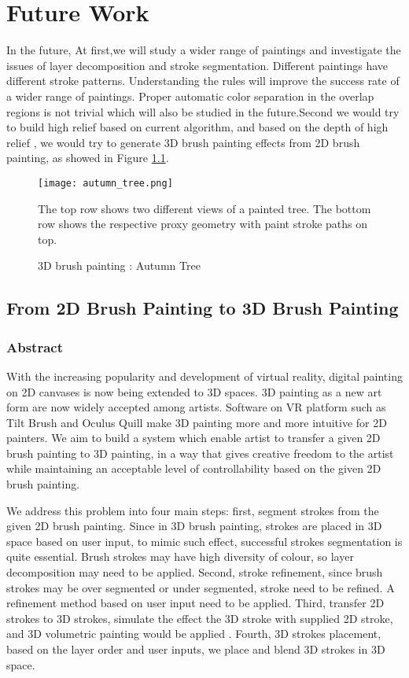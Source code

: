 \chapter{Future Work}
In the future, At first,we will study a wider range of paintings and investigate the issues of layer decomposition and stroke segmentation. Different paintings have different stroke patterns. Understanding the rules will improve the success rate of a wider range of paintings. Proper automatic color separation in the overlap regions is not trivial which will also be studied in the future.Second we would try to build high relief based on current algorithm, and based on the depth of high relief , we would try to generate 3D brush painting effects from 2D brush painting, as showed in Figure \ref{Autumn Tree}.
\begin{figure}[H]
	\centering
	\texttt{[image: autumn\_tree.png]}
	\caption{3D brush painting : Autumn Tree}
	\label{Autumn Tree}
	\medskip
	The top row shows two different views of a painted tree. The bottom row shows the respective proxy geometry with paint stroke paths on top.
\end{figure}
\section{From 2D Brush Painting to 3D Brush Painting}
\subsection{Abstract} 
With the increasing popularity and development of virtual reality, digital painting on 2D canvases is now being extended to 3D spaces. 3D painting as a new art form are now widely accepted among artists. Software on VR platform such as Tilt Brush and Oculus Quill make 3D painting more and more intuitive for 2D painters.   
We aim to build a system which enable artist to transfer a given 2D brush painting to 3D painting, in a way that gives creative freedom to the artist while maintaining an acceptable level of controllability based on the given 2D brush painting. 

We address this problem into four main steps: 
first, segment strokes from the given 2D brush painting. Since in 3D brush painting, strokes are placed in 3D space based on user input, to mimic such effect, successful strokes segmentation is quite essential. Brush strokes may have high diversity of colour, so layer decomposition may need to be applied. 
Second, stroke refinement, since brush strokes may be over segmented or under segmented, stroke need to be refined. A refinement method based on user input need to be applied. 
Third, transfer 2D strokes to 3D strokes, simulate the effect the 3D stroke with supplied 2D stroke, and 3D volumetric painting would be applied \cite{kim2017canvox}. 
Fourth, 3D strokes placement, based on the layer order and user inputs, we place and blend 3D strokes in 3D space. 

